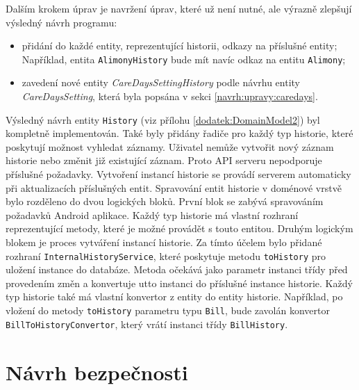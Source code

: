         Dalším krokem úprav je navržení úprav, které už není nutné, ale výrazně zlepšují výsledný návrh programu:
        \begin{itemize}
            \item přidání do každé entity, reprezentující historii, odkazy na příslušné entity; Například, entita \texttt{AlimonyHistory} bude mít navíc odkaz na entitu \texttt{Alimony};
            \item zavedení nové entity \textit{CareDaysSettingHistory} podle návrhu entity \textit{CareDaysSetting}, která byla popsána v sekci \ref{navrh:upravy:caredays}.
        \end{itemize}
        Výsledný návrh entity \verb|History| (viz přílohu \ref{dodatek:DomainModel2}) byl kompletně implementován. Také byly přidány řadiče pro každý typ historie, které poskytují možnost vyhledat záznamy. Uživatel nemůže vytvořit nový záznam historie nebo změnit již existující záznam. Proto API serveru nepodporuje příslušné požadavky. Vytvoření instancí historie se provádí serverem automaticky při aktualizacích příslušných entit.
        Spravování entit historie v doménové vrstvě bylo rozděleno do dvou logických bloků. První blok se zabývá spravováním požadavků Android aplikace. Každý typ historie má vlastní rozhraní reprezentující metody, které je možné provádět s touto entitou. Druhým logickým blokem je proces vytváření instancí historie. Za tímto účelem bylo přidané rozhraní \verb|InternalHistoryService|, které poskytuje metodu \verb|toHistory| pro uložení instance do databáze.
        Metoda očekává jako parametr instanci třídy před provedením změn a konvertuje utto instanci do příslušné instance historie. Každý typ historie také má vlastní konvertor z entity do entity historie. Například, po vložení do metody \verb|toHistory| parametru typu \verb|Bill|, bude zavolán konvertor \verb|BillToHistoryConvertor|, který vrátí instanci třídy \verb|BillHistory|. 

\section{Návrh bezpečnosti}\label{navrh:bezpecnost}
